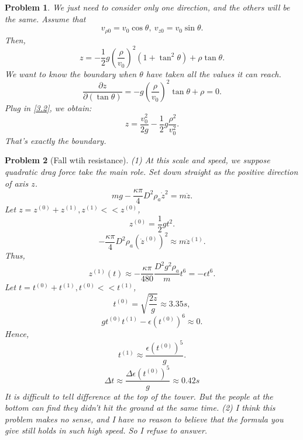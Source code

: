 \documentclass{article}
\theoremstyle{1}
\newtheorem{problem}{Problem}
\newcommand{\pa}{\partial}
\begin{document}
\begin{problem}
    We just need to consider only one direction, and the others will be the same. Assume that 
    \begin{equation}
        v_{\rho0}=v_0\cos\theta,\ v_{z0}=v_0\sin\theta.
    \end{equation}
    Then, 
    \begin{equation}\label{3.2}
        z=-\frac{1}{2}g\left(\frac{\rho}{v_0}\right)^2(1+\tan^2\theta)+\rho \tan\theta.
    \end{equation}
    We want to know the boundary when $\theta$ have taken all the values it can reach.
    \begin{equation}
        \frac{\pa z}{\pa (\tan\theta)}=-g\left(\frac{\rho}{v_0}\right)^2\tan\theta+\rho=0.
    \end{equation}
Plug in \eqref{3.2}, we obtain:
\begin{equation}
    z=\frac{v_0^2}{2g}-\frac{1}{2}g\frac{\rho^2}{v_0^2}.
\end{equation}
That's exactly the boundary.
\end{problem}
\begin{problem}[Fall wtih resistance]
   (1) At this scale and speed, we suppose quadratic drag force take the main role. Set down straight as the positive direction of axis $z$.
   \begin{equation}
    mg-\frac{\kappa \pi}{4}D^2\rho_a \dot{z}^2=m\ddot{z}.
   \end{equation} 
   Let $z=z^{(0)}+z^{(1)},z^{(1)}<<z^{(0)}$,
   \begin{equation}
    z^{(0)}=\frac{1}{2}gt^2.
   \end{equation}
   \begin{equation}
    -\frac{\kappa \pi}{4}D^2\rho_a (\dot{z}^{(0)})^2\approx m\ddot{z}^{(1)}.
   \end{equation}
Thus,
\begin{equation}
    z^{(1)}(t)\approx-\frac{\kappa\pi}{480}\frac{D^2g^2\rho_a}{m}t^6=-\epsilon t^6.
\end{equation}
Let $t=t^{(0)}+t^{(1)},t^{(0)}<<t^{(1)} $,
\begin{equation}
    t^{(0)}=\sqrt{\frac{2z}{g}}\approx3.35s,
\end{equation}
\begin{equation}
    gt^{(0)}t^{(1)}-\epsilon \left(t^{(0)}\right)^6\approx0.
\end{equation}
Hence,
\begin{equation}
    t^{(1)}\approx\frac{\epsilon (t^{(0)})^5}{g}.
\end{equation}
\begin{equation}
    \Delta t\approx\frac{\Delta \epsilon(t^{(0)})^5}{g}\approx0.42s
\end{equation}
It is difficult to tell difference at the top of the tower. But the people at the bottom can find they didn't hit the ground at the same time.
\newline
(2)
I think this problem makes no sense, and I have no reason to believe that the formula you give still holds in such high speed. So I refuse to answer.
\end{problem}
\end{document}
